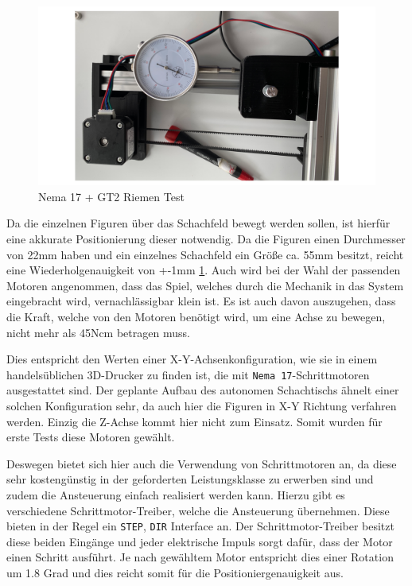 \begin{figure}
\centering
\includegraphics{images/nema17_accuary_test.png}
\caption{Nema 17 + GT2 Riemen Test \label{nema17_accuary_test}}
\end{figure}

Da die einzelnen Figuren über das Schachfeld bewegt werden sollen, ist
hierfür eine akkurate Positionierung dieser notwendig. Da die Figuren
einen Durchmesser von 22mm haben und ein einzelnes Schachfeld ein Größe
ca. 55mm besitzt, reicht eine Wiederholgenauigkeit von +-1mm
\ref{nema17_accuary_test}. Auch wird bei der Wahl der passenden Motoren
angenommen, dass das Spiel, welches durch die Mechanik in das System
eingebracht wird, vernachlässigbar klein ist. Es ist auch davon
auszugehen, dass die Kraft, welche von den Motoren benötigt wird, um
eine Achse zu bewegen, nicht mehr als 45Ncm betragen muss.

Dies entspricht den Werten einer X-Y-Achsenkonfiguration, wie sie in
einem handelsüblichen 3D-Drucker zu finden ist, die mit
\passthrough{\lstinline!Nema 17!}-Schrittmotoren ausgestattet sind. Der
geplante Aufbau des autonomen Schachtischs ähnelt einer solchen
Konfiguration sehr, da auch hier die Figuren in X-Y Richtung verfahren
werden. Einzig die Z-Achse kommt hier nicht zum Einsatz. Somit wurden
für erste Tests diese Motoren gewählt.

Deswegen bietet sich hier auch die Verwendung von Schrittmotoren an, da
diese sehr kostengünstig in der geforderten Leistungsklasse zu erwerben
sind und zudem die Ansteuerung einfach realisiert werden kann. Hierzu
gibt es verschiedene Schrittmotor-Treiber, welche die Ansteuerung
übernehmen. Diese bieten in der Regel ein
\passthrough{\lstinline!STEP!}, \passthrough{\lstinline!DIR!} Interface
an. Der Schrittmotor-Treiber besitzt diese beiden Eingänge und jeder
elektrische Impuls sorgt dafür, dass der Motor einen Schritt ausführt.
Je nach gewähltem Motor entspricht dies einer Rotation um 1.8 Grad und
dies reicht somit für die Positioniergenauigkeit aus.

